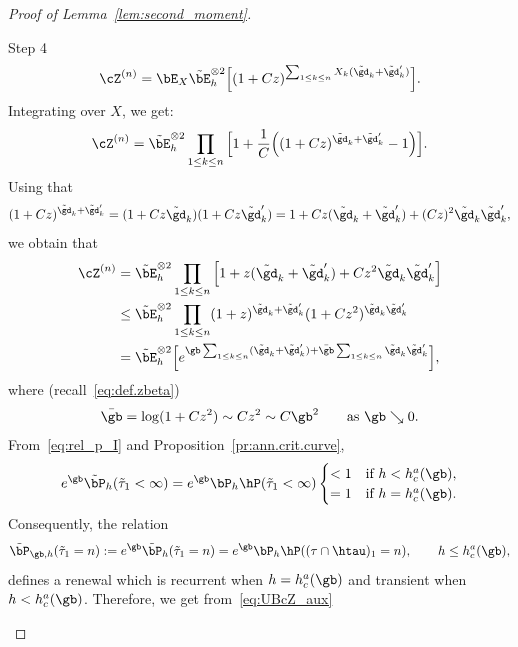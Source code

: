 \begin{proof}[Proof of Lemma~\ref{lem:second_moment}]
\begin{step}{Step 4}
\begin{equation}
\cZ^{(n)} = \bE_X \tilde \bE_h^{\otimes 2} \Big[(1 + C z)^{\sum_{1\leq k\leq n} X_k (\tilde \gd_k + \tilde \gd_k')} \Big].
\end{equation}
Integrating over $X$, we get:
\begin{equation}
\cZ^{(n)} = \tilde \bE_h^{\otimes 2} \prod_{1\leq k \leq n} \Big[1 + \frac{1}{C} \Big((1 + C z)^{\tilde \gd_k + \tilde \gd_k'} - 1 \Big) \Big].
\end{equation}
Using that
\begin{equation}
(1 + C z)^{\tilde \gd_k + \tilde \gd_k'} = (1 + C z \tilde \gd_k)(1 + C z \tilde \gd_k') = 1 + C z (\tilde \gd_k + \tilde \gd_k') + (C z)^2 \tilde \gd_k \tilde \gd_k',
\end{equation}
we obtain that
\begin{equation}\label{eq:UBcZ_aux}
\begin{aligned}
\cZ^{(n)} &= \tilde \bE_h^{\otimes 2} \prod_{1\leq k\leq n} \Big[1 + z (\tilde \gd_k + \tilde \gd_k') + C z^2 \tilde \gd_k \tilde \gd_k' \Big]\\
&\leq \tilde \bE_h^{\otimes 2} \prod_{1\leq k\leq n} (1 + z)^{\tilde \gd_k + \tilde \gd_k'} (1 + C z^2)^{\tilde \gd_k \tilde \gd_k'}\\
&= \tilde \bE_h^{\otimes 2} \Big[e^{\gb \sum_{1\leq k\leq n} (\tilde \gd_k + \tilde \gd_k') + \bar\gb \sum_{1\leq k\leq n} \tilde \gd_k \tilde \gd_k'} \Big],
\end{aligned}
\end{equation}
where (recall~\eqref{eq:def.zbeta})
\begin{equation}
\bar\gb = \log(1 + C z^2) \sim C z^2 \sim C \gb^2 \qquad \text{as } \gb \searrow 0.
\end{equation}
From~\eqref{eq:rel_p_I} and Proposition~\ref{pr:ann.crit.curve},
\begin{equation} e^\gb \tilde \bP_h (\tilde\tau_1 < \infty) = e^\gb \bP_h\hP (\tilde\tau_1 < \infty)
\begin{cases}
<1 & \text{if } h < h_c^a(\gb),\\
=1 & \text{if } h = h_c^a(\gb).
\end{cases}
\end{equation}
Consequently, the relation
\begin{equation}
\tilde \bP_{\gb,h}(\tilde \tau_1 = n) := e^\gb \tilde \bP_h(\tilde \tau_1 = n) = e^\gb \bP_h \hP((\tau \cap \htau)_1 = n),\qquad h \leq h_c^a(\gb),
\end{equation}
defines a renewal which is recurrent when $h = h_c^a(\gb)$ and transient when $h < h_c^a(\gb)$. Therefore, we get from~\eqref{eq:UBcZ_aux}

\end{step}
\end{proof}
